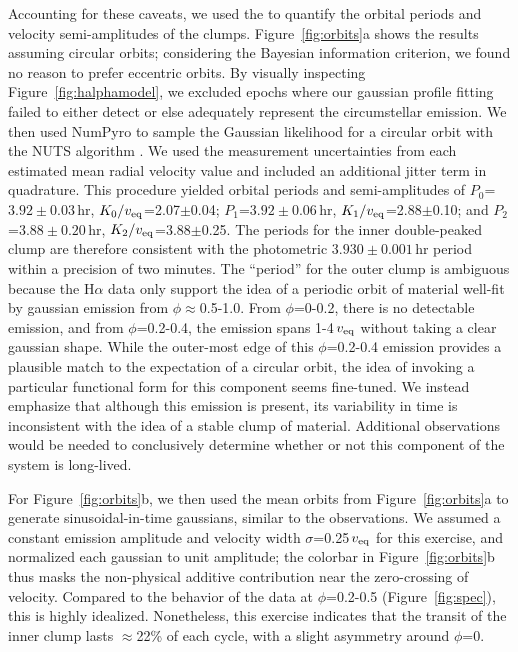\documentclass[11pt,twocolumn,tighten]{aastex7}
\begin{document}
Accounting for these caveats, we used the to quantify the orbital periods and
velocity semi-amplitudes of the clumps.  Figure~\ref{fig:orbits}a
shows the results assuming circular orbits; considering the Bayesian
information criterion, we found no reason to prefer eccentric orbits.
By visually inspecting Figure~\ref{fig:halphamodel}, we
excluded epochs where our gaussian profile fitting failed to either
detect or else adequately represent the circumstellar emission.  We
then used NumPyro to sample the Gaussian likelihood for a circular
orbit with the NUTS algorithm \citep{Phan2019}.  We used the
measurement uncertainties from each estimated mean radial velocity
value and included an additional jitter term in quadrature.  This
procedure yielded orbital periods and semi-amplitudes of
$P_0$=$3.92\pm0.03$\,hr, $K_0/v_{\rm eq}$=2.07$\pm$0.04;
$P_1$=$3.92\pm0.06$\,hr, $K_1/v_{\rm eq}$=2.88$\pm$0.10;
and $P_2$=$3.88\pm0.20$\,hr, $K_2/v_{\rm eq}$=3.88$\pm$0.25.
The periods for the inner double-peaked clump are therefore consistent
with the photometric $3.930\pm0.001$\,hr period within a precision of
two minutes.  The ``period'' for the outer clump is ambiguous because
the H$\alpha$ data only support the idea of a periodic orbit of
material well-fit by gaussian emission from $\phi$$\approx$0.5-1.0.
From $\phi$=0-0.2, there is no detectable emission, and from
$\phi$=0.2-0.4, the emission spans 1-4\,$v_{\rm eq}$ without taking a
clear gaussian shape.  While the outer-most edge of this
$\phi$=0.2-0.4 emission provides a plausible match to the expectation
of a circular orbit, the idea of invoking a particular functional form
for this component seems fine-tuned.  We instead emphasize that
although this emission is present, its variability in time is
inconsistent with the idea of a stable clump of material.  Additional
observations would be needed to conclusively determine whether or not
this component of the system is long-lived.

For Figure~\ref{fig:orbits}b, we then used the mean orbits from
Figure~\ref{fig:orbits}a to generate sinusoidal-in-time gaussians,
similar to the observations.  We assumed a constant emission amplitude
and velocity width $\sigma$=0.25\,$v_{\rm eq}$ for this exercise, and
normalized each gaussian to unit amplitude;  the colorbar in
Figure~\ref{fig:orbits}b thus masks the non-physical additive
contribution near the zero-crossing of velocity.  Compared to the
behavior of the data at $\phi$=0.2-0.5 (Figure~\ref{fig:spec}), this
is highly idealized.  Nonetheless, this exercise indicates that the
transit of the inner clump lasts $\approx$22\% of each cycle, with a
slight asymmetry around $\phi$=0.
\end{document}
